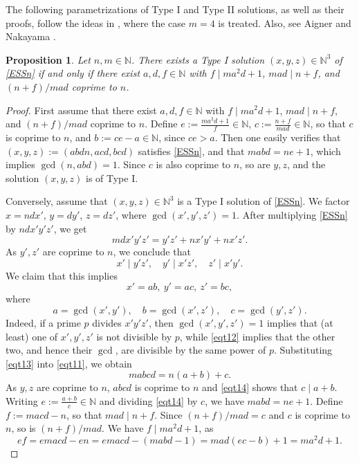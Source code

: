 \documentclass[12pt]{amsart}
\newtheorem{prop}[theorem]{Proposition}
\theoremstyle{definition}
\theoremstyle{remark}
\numberwithin{equation}{section}
\begin{document}
The following parametrizations of Type I and Type II solutions, as well as their proofs,
follow the ideas in \cite[Section 2]{ET}, where the case $m=4$ is treated.
Also, see Aigner \cite{A} and Nakayama \cite{N}.


\begin{prop}\label{proptype1par}
Let $n,m \in \mathbb{N}$. There exists a Type I solution $(x,y,z)\in \mathbb{N}^3$ of \eqref{ESSn} if and only if 
there exist $a, d, f \in \mathbb{N}$ with $f\mid ma^2d+1$, $mad\mid n+f$, and $(n+f)/mad$ coprime to $n$. 
\end{prop}

\begin{proof}
First assume that there exist $a, d, f \in \mathbb{N}$ with $f\mid ma^2d+1$, $mad\mid n+f$, and $(n+f)/mad$ coprime to $n$. 
Define $e:=\frac{ma^2d+1}{f}\in \mathbb{N}$, $c:=\frac{n+f}{mad}\in \mathbb{N}$, so that $c$ is coprime to $n$,
and $b:=ce-a\in \mathbb{N}$, since $ce>a$. Then one easily verifies that $(x,y,z):=(abdn,acd, bcd)$ satisfies \eqref{ESSn},
and that $mabd=ne+1$, which implies $\gcd(n,abd)=1$. Since $c$ is also coprime to $n$,
so are $y,z$, and the solution $(x,y,z)$ is of Type I.

Conversely, assume that  $(x,y,z)\in \mathbb{N}^3$ is a Type I solution of \eqref{ESSn}.
We factor $x = ndx'$, $y = dy'$, $z = dz'$, where $\gcd(x',y',z')=1$. After multiplying \eqref{ESSn}
by $ndx'y'z'$, we get
\begin{equation}\label{eqt11}
mdx'y'z' = y'z' + nx'y' + nx'z'.
\end{equation}
As $y',z'$ are coprime to $n$, we conclude that 
\begin{equation}\label{eqt12}
x'\mid y'z', \quad y'\mid x'z', \quad z'\mid x'y'.
\end{equation}
We claim that this  implies
\begin{equation}\label{eqt13}
x'=ab, \ y'=ac, \ z'=bc,
\end{equation}
where
$$
a=\gcd(x',y'),\quad b=\gcd(x',z'), \quad c=\gcd(y',z').
$$
Indeed, if a prime $p$ divides $x'y'z'$, then $\gcd(x',y',z')=1$ implies that (at least) one of $x',y',z'$ is 
not divisible by $p$, while \eqref{eqt12} implies that the other two, and hence their $\gcd$, are divisible 
by the same power of $p$. 
Substituting \eqref{eqt13} into \eqref{eqt11}, we obtain
\begin{equation}\label{eqt14}
mabcd = n(a+b)+c.
\end{equation}
As $y,z$ are coprime to $n$, $abcd$ is coprime to $n$ and
\eqref{eqt14} shows that $c\mid a+b$. Writing $e:=\frac{a+b}{c}\in \mathbb{N}$ and dividing \eqref{eqt14} by $c$, we have 
$mabd = ne+1$. Define $f:=macd-n$, so that $mad\mid n+f$. Since $(n+f)/mad=c$ and $c$ is coprime to $n$, so is $(n+f)/mad$.
We have $f\mid ma^2d+1$, as
$$
ef = emacd-en=emacd-(mabd-1)=mad(ec-b)+1=ma^2d+1.
$$
\end{proof}
\end{document}
